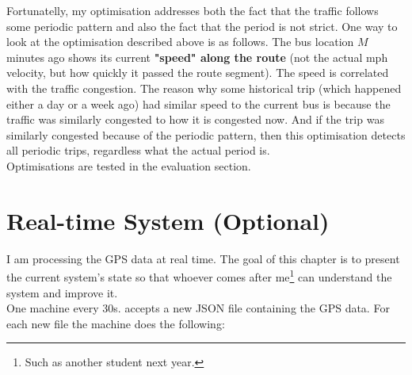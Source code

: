 \documentclass[12pt,a4paper,oneside,openright]{report}
\begin{document}
Fortunatelly, my optimisation addresses both the fact that the traffic follows some
periodic pattern and also the fact that the period is not strict. One way to look at
the optimisation described above is as follows. The bus location $M$ minutes ago shows
its current \textbf{"speed" along the route} (not the actual mph velocity, but how
quickly it passed the route segment). The speed is correlated with the traffic
congestion. The reason why some historical trip (which happened either a day or a week
ago) had similar speed to the current bus is because the traffic was similarly
congested to how it is congested now. And if the trip was similarly congested because
of the periodic pattern, then this optimisation detects all periodic trips, regardless
what the actual period is. \\

Optimisations are tested in the evaluation section.


\newpage

\section{Real-time System (Optional)}

I am processing the GPS data at real time. The goal of this chapter is to present
the current system's state so that whoever comes after
me\footnote{Such as another student next year.} can understand the system and
improve it. \\

One machine every 30s. accepts a new JSON file containing the GPS data. For each new
file the machine does the following:
\end{document}
